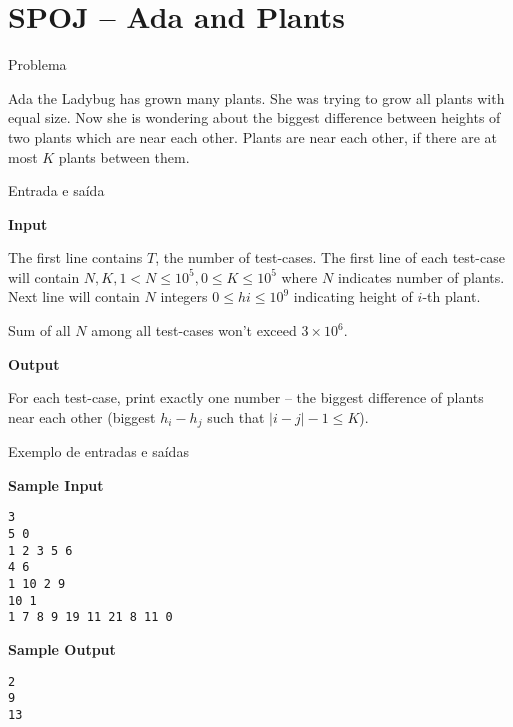 \section{SPOJ -- Ada and Plants}

\begin{frame}[fragile]{Problema}

Ada the Ladybug has grown many plants. She was trying to grow all plants with equal size. Now she
is wondering about the biggest difference between heights of two plants which are near each other.
Plants are near each other, if there are at most $K$ plants between them.

\end{frame}

\begin{frame}[fragile]{Entrada e saída}

\textbf{Input}

The first line contains $T$, the number of test-cases. The first line of each test-case will
contain $N, K, 1 < N\leq 10^5, 0\leq K\leq 10^5$ where $N$ indicates number of plants.
Next line will contain $N$ integers $0\leq hi\leq 10^9$ indicating height of $i$-th plant.

Sum of all $N$ among all test-cases won't exceed $3\times 10^6$.

\vspace{0.1in}

\textbf{Output}

For each test-case, print exactly one number -- the biggest difference of plants near each other
(biggest $h_i-h_j$ such that $|i-j|-1\leq K$).

\end{frame}

\begin{frame}[fragile]{Exemplo de entradas e saídas}

\begin{minipage}[t]{0.5\textwidth}
\textbf{Sample Input}
\begin{verbatim}
3
5 0
1 2 3 5 6
4 6
1 10 2 9
10 1
1 7 8 9 19 11 21 8 11 0 
\end{verbatim}
\end{minipage}
\begin{minipage}[t]{0.45\textwidth}
\textbf{Sample Output}
\begin{verbatim}
2
9
13
\end{verbatim}
\end{minipage}
\end{frame}

